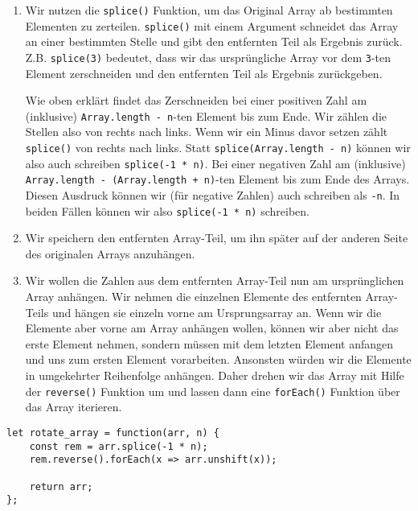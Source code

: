 \documentclass[babel]{book}
\begin{document}
\begin{enumerate} 
	\item Wir nutzen die \lstinline|splice()| Funktion, um das Original Array ab bestimmten Elementen zu zerteilen. \lstinline|splice()| mit einem Argument schneidet das Array an einer bestimmten Stelle und gibt den entfernten Teil als Ergebnis zurück. Z.B. \lstinline|splice(3)| bedeutet, dass wir das ursprüngliche Array vor dem \lstinline|3|-ten Element zerschneiden und den entfernten Teil als Ergebnis zurückgeben.
	
	Wie oben erklärt findet das Zerschneiden bei einer positiven Zahl am (inklusive) \lstinline|Array.length - n|-ten Element bis zum Ende. Wir zählen die Stellen also von rechts nach links. Wenn wir ein Minus davor setzen zählt \lstinline|splice()| von rechts nach links. Statt \lstinline|splice(Array.length - n)| können wir also auch schreiben \lstinline|splice(-1 * n)|. Bei einer negativen Zahl am (inklusive) \lstinline|Array.length - (Array.length + n)|-ten Element bis zum Ende des Arrays. Diesen Ausdruck können wir (für negative Zahlen) auch schreiben als \lstinline|-n|. In beiden Fällen können wir also \lstinline|splice(-1 * n)| schreiben.
	\item Wir speichern den entfernten Array-Teil, um ihn später auf der anderen Seite des originalen Arrays anzuhängen.
	\item Wir wollen die Zahlen aus dem entfernten Array-Teil nun am ursprünglichen Array anhängen. Wir nehmen die einzelnen Elemente des entfernten Array-Teils und hängen sie einzeln vorne am Ursprungsarray an. Wenn wir die Elemente aber vorne am Array anhängen wollen, können wir aber nicht das erste Element nehmen, sondern müssen mit dem letzten Element anfangen und uns zum ersten Element vorarbeiten. Ansonsten würden wir die Elemente in umgekehrter Reihenfolge anhängen. Daher drehen wir das Array mit Hilfe der \lstinline|reverse()| Funktion um und lassen dann eine \lstinline|forEach()| Funktion über das Array iterieren. 
	
\end{enumerate}

\begin{lstlisting}[caption=My Javascript Example]
let rotate_array = function(arr, n) {
	const rem = arr.splice(-1 * n);
	rem.reverse().forEach(x => arr.unshift(x));    

	return arr;
};
\end{lstlisting}
\end{document}
